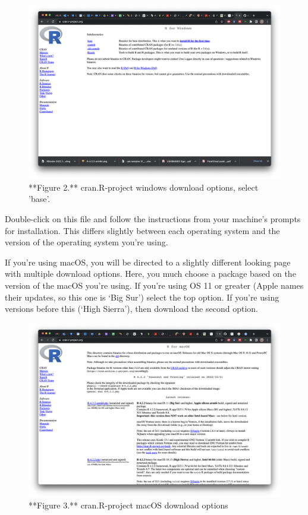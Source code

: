 \documentclass[
]{article}
\begin{document}
\begin{figure}

{\centering \includegraphics{images/cran_download} 

}

\caption{**Figure 2.** cran.R-project windows download options, select 'base'.}\label{fig:screenshot of download options}
\end{figure}

\hfill\break

Double-click on this file and follow the instructions from your
machine's prompts for installation. This differs slightly between each
operating system and the version of the operating system you're using.

If you're using macOS, you will be directed to a slightly different
looking page with multiple download options. Here, you much choose a
package based on the version of the macOS you're using. If you're using
OS 11 or greater (Apple names their updates, so this one is `Big Sur')
select the top option. If you're using versions before this (`High
Sierra'), then download the second option.

\begin{figure}

{\centering \includegraphics{images/cran_macDL} 

}

\caption{**Figure 3.** cran.R-project macOS download options}\label{fig:screenshot of macOS DL options}
\end{figure}
\end{document}
